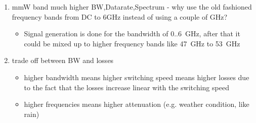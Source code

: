 \begin{enumerate}
	\item mmW band much higher BW,Datarate,Spectrum - why use the old fashioned frequency bands from DC to 6GHz instead of using a couple of GHz?
	\begin{itemize}
		\item Signal generation is done for the bandwidth of 0..\SI{6}{\GHz}, after that it could be mixed up to higher frequency bands like \SI{47}{\GHz} to \SI{53}{\GHz}
	\end{itemize}
	\item trade off between BW and losses
	\begin{itemize}
		\item higher bandwidth means higher switching speed means higher losses due to the fact that the losses increase linear with the switching speed
	\item higher frequencies means higher attenuation (e.g. weather condition, like rain)
	\end{itemize}
\end{enumerate}